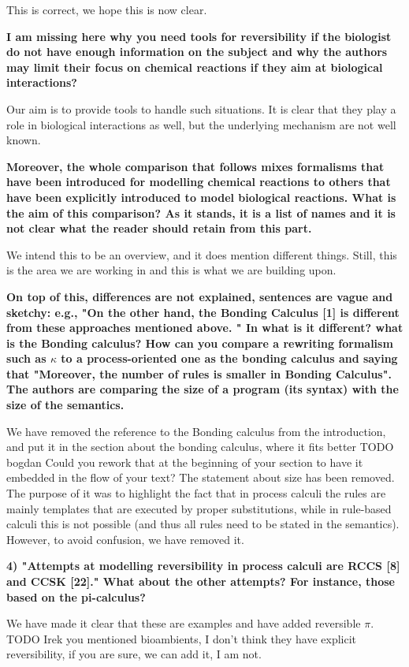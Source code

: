\documentclass{article}
\begin{document}
This is correct, we hope this is now clear.

\textbf{I am missing here why you need tools for reversibility if the biologist do not have enough information on the subject and why the authors may limit their focus on chemical reactions if they aim at biological interactions?}

Our aim is to provide tools to handle such situations. It is clear that they play a role in biological interactions as well, but the underlying mechanism are not well known.

\textbf{Moreover, the whole comparison that follows mixes formalisms that have been introduced for modelling chemical reactions to others that have been explicitly introduced to model biological reactions. What is the aim of this comparison? As it stands, it is a list of names and it is not clear what the reader should retain from this part.}

We intend this to be an overview, and it does mention different things. Still, this is the area we are working in and this is what we are building upon.

\textbf{On top of this, differences are not explained, sentences are vague and sketchy:
 e.g., "On the other hand, the Bonding Calculus [1] is different from these approaches mentioned above. "
 In what is it different?  what is the Bonding calculus?
How can you compare a rewriting formalism such as $\kappa$ to a process-oriented one as the bonding calculus and saying that "Moreover, the number of rules is smaller in Bonding Calculus". The authors are comparing the size of a program (its syntax) with the size of the semantics.}

We have removed the reference to the Bonding calculus from the introduction, and put it in the section about the bonding calculus, where it fits better TODO bogdan Could you rework that at the beginning of your section to have it embedded in the flow of your text?
The statement about size has been removed. The purpose of it was to highlight the fact that in process
calculi the rules are mainly templates that are executed by proper
substitutions, while in rule-based calculi this is not possible (and thus all
rules need to be stated in the semantics). However, to avoid confusion, we have removed it.

\textbf{4) "Attempts at modelling reversibility in process calculi are RCCS [8] and CCSK [22]." What about the other attempts? For instance, those based on the pi-calculus?}

We have made it clear that these are examples and have added reversible $\pi$. TODO Irek you mentioned bioambients, I don't think they have explicit reversibility, if you are sure, we can add it, I am not.
\end{document}
